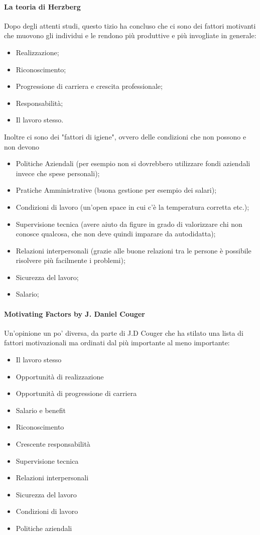 \paragraph{La teoria di Herzberg}
Dopo degli attenti studi, questo tizio ha concluso che ci sono dei fattori motivanti che muovono gli individui e le rendono più produttive e più invogliate in generale:
\begin{itemize}
	\item Realizzazione;
	\item Riconoscimento;
	\item Progressione di carriera e crescita professionale;
	\item Responsabilità;
	\item Il lavoro stesso.
\end{itemize}
Inoltre ci sono dei "fattori di igiene", ovvero delle condizioni che non possono e non devono
\begin{itemize}
	\item Politiche Aziendali (per esempio non si dovrebbero utilizzare fondi aziendali invece che spese personali);
	\item Pratiche Amministrative (buona gestione per esempio dei salari);
	\item Condizioni di lavoro (un'open space in cui c'è la temperatura corretta etc.);
	\item Supervisione tecnica (avere aiuto da figure in grado di valorizzare chi non conosce qualcosa, che non deve quindi imparare da autodidatta);
	\item Relazioni interpersonali (grazie alle buone relazioni tra le persone è possibile risolvere più facilmente i problemi);
	\item Sicurezza del lavoro;
	\item Salario;
\end{itemize}
\paragraph{Motivating Factors by J. Daniel Couger}
Un'opinione un po' diversa, da parte di J.D Couger che ha stilato una lista di fattori motivazionali ma ordinati dal più importante al meno importante:
\begin{itemize}
	\item Il lavoro stesso
	\item Opportunità di realizzazione
	\item Opportunità di progressione di carriera
	\item Salario e benefit
	\item Riconoscimento
	\item Crescente responsabilità
	\item Supervisione tecnica
	\item Relazioni interpersonali
	\item Sicurezza del lavoro
	\item Condizioni di lavoro
	\item Politiche aziendali
\end{itemize}
